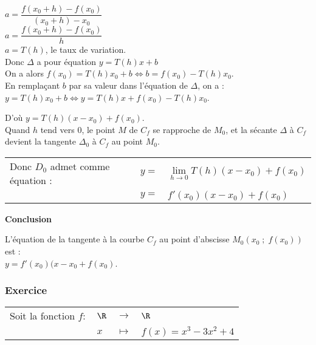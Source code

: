 $a = \dfrac{f(x_0 + h) - f(x_0)}{\left(x_0 + h\right)-x_0}$ \vspace*{.3cm} \\

$a = \dfrac{f(x_0 + h) - f(x_0)}{h}$ \vspace*{.3cm} \\

$a = T(h)$, le taux de variation. \\

Donc $\Delta$ a pour équation $y = T(h)x + b$ \\

On a alors $f(x_0) = T(h)x_0 + b \Longleftrightarrow b = f(x_0) - T(h)x_0$. \\

En remplaçant $b$ par sa valeur dans l'équation de $\Delta$, on a : \\$y = T(h)x_0 + b \Longleftrightarrow y = T(h)x + f(x_0) - T(h)x_0$. 

\vspace*{.3cm}

D'où $y = T(h)(x-x_0) + f(x_0)$. \\

Quand $h$ tend vers 0, le point $M$ de $C_f$ se rapproche de $M_0$, et la sécante $\Delta$ à $C_f$ devient la tangente $\Delta_0$ à $C_f$ au point $M_0$. \\

\begin{tabular}{lll}
Donc $D_0$ admet comme équation : & $y =$ & $\lim\limits_{h \to 0} T(h) (x-x_0) + f(x_0)$ \vspace*{.3cm} \\
& $y =$ & $f'(x_0)(x-x_0) + f(x_0)$ \\
\end{tabular}

\vspace*{.3cm}

\textbf{Conclusion}

L'équation de la tangente à la courbe $C_f$ au point d'abscisse $M_0\left(x_0 \; ; \; f(x_0) \right)$ est : \\ $y = f'(x_0)(x-x_0 + f(x_0)$. 

\newpage

\subsubsection*{Exercice}

\begin{tabular}{llll}
Soit la fonction $f :$ & $\R$ & $\longrightarrow$ & $\R$ \\
& $x$ & $\longmapsto$ & $f(x) = x^3 - 3x^2 + 4$ \\
\end{tabular}

